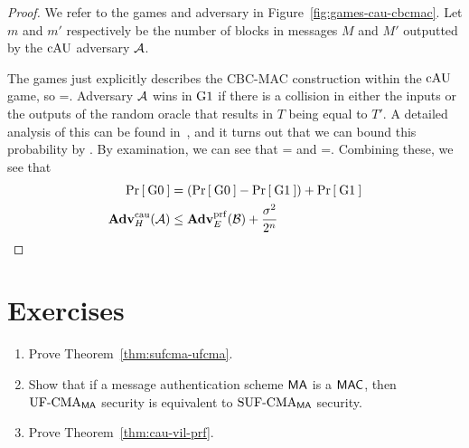 \begin{proof}
	We refer to the games and adversary in Figure~\ref{fig:games-cau-cbcmac}. Let $m$ and $m'$ respectively be the number of blocks in messages $M$ and $M'$ outputted by the $\textnormal{cAU}$ adversary ${\mathcal A}$. 
	
	The games just explicitly describes the CBC-MAC construction within the $\textnormal{cAU}$ game, so 
	\bnm
	=\;.
	\enm
	Adversary ${\mathcal A}$ wins in ${{\textnormal G}}1$ if there is a collision in either the inputs or the outputs of the random oracle that results in $T$ being equal to $T'$. A detailed analysis of this can be found in~\cite{black2000cbc}, and it turns out that we can bound this probability by 
	\bnm
	\leq {}\;.
	\enm
	By examination, we can see that 
	\bnm
	=
	\enm
	and
	\bnm
	=\;.
	\enm
	Combining these, we see that 
	\begin{align*}
	\Pr\left[\: {{\textnormal G}}0 \:\right]&=(\Pr\left[\: {{\textnormal G}}0 \:\right]-\Pr\left[\: {{\textnormal G}}1 \:\right]) + \Pr\left[\: {{\textnormal G}}1 \:\right]\\
	\mathbf{Adv}^{\mathrm{cau}}_{H}({\mathcal A})&\leq \mathbf{Adv}^{\mathrm{prf}}_{E}({\mathcal B}) + \frac{\sigma^2}{2^n}
	\end{align*}
\end{proof}

\section*{Exercises}
\begin{enumerate}[label=\textbf{Exercise \thesection.\arabic*}, wide=0pt]
	\item Prove Theorem~\ref{thm:sufcma-ufcma}. \label{exercise:sufcma-ufcma}
	\item Show that if a message authentication scheme $\mathsf{MA}$ is a $\mathsf{MAC}$, then $\textnormal{UF-CMA}_{\mathsf{MA}}$ security is equivalent to $\textnormal{SUF-CMA}_{\mathsf{MA}}$ security. \label{exercise:mac-sufcma-ufcma}
	\item Prove Theorem~\ref{thm:cau-vil-prf}.
\end{enumerate}